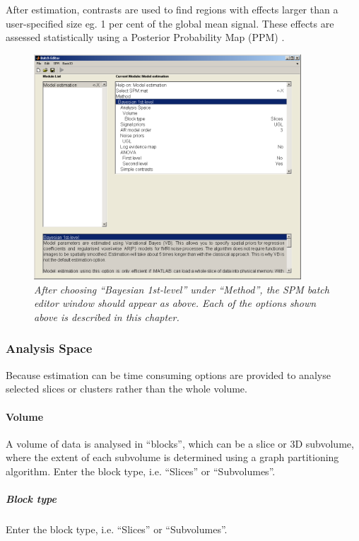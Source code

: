 After estimation, contrasts are used to find regions with effects larger than a user-specified size eg. 1 per cent of the global mean signal. These effects are assessed statistically using a Posterior Probability Map (PPM) \cite{karl_posterior}.

\begin{figure}
\begin{center}
\includegraphics[width=100mm]{fmri_est/bayes_options}
\end{center}
\caption{\em After choosing ``Bayesian 1st-level'' under ``Method'', the SPM batch editor window should appear as above. Each of the options shown above is described in this chapter. \label{bayes_options}}
\end{figure}

\subsubsection{Analysis Space}

Because estimation can be time consuming options are provided to analyse selected slices or clusters rather than the whole volume.

\paragraph{Volume}

A volume of data is analysed in ``blocks'', which can be a slice or 3D subvolume, where the extent of each subvolume is determined using a graph partitioning algorithm. Enter the block type, i.e. ``Slices'' or ``Subvolumes''.

\subparagraph{Block type}

Enter the block type, i.e. ``Slices'' or ``Subvolumes''.

